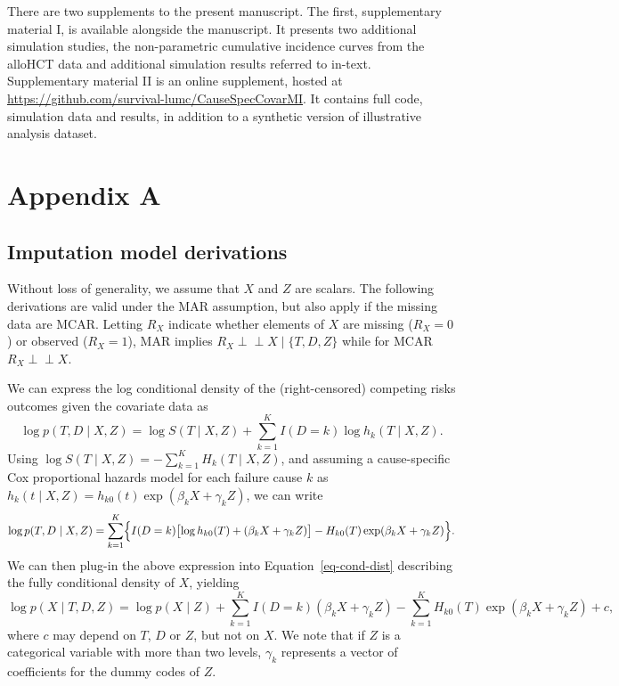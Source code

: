 \documentclass[
  letterpaper,
  DIV=11,
  numbers=noendperiod]{scrreprt}
\newcommand{\indep}{\perp\!\!\!\!\perp}
\begin{document}

There are two supplements to the present manuscript. The first,
supplementary material I, is available alongside the manuscript. It
presents two additional simulation studies, the non-parametric
cumulative incidence curves from the alloHCT data and additional
simulation results referred to in-text. Supplementary material II is an
online supplement, hosted at
\url{https://github.com/survival-lumc/CauseSpecCovarMI}. It contains
full code, simulation data and results, in addition to a synthetic
version of illustrative analysis dataset.

\hypertarget{appendix-a}{%
\section*{Appendix A}\label{appendix-a}}


\hypertarget{imputation-model-derivations}{%
\subsection*{Imputation model
derivations}\label{imputation-model-derivations}}

Without loss of generality, we assume that \(X\) and \(Z\) are scalars.
The following derivations are valid under the MAR assumption, but also
apply if the missing data are MCAR. Letting \(R_X\) indicate whether
elements of \(X\) are missing (\(R_X = 0\)) or observed (\(R_X = 1\)),
MAR implies \(R_X \indep X \mid \{T,D,Z\}\) while for MCAR
\(R_X \indep X\).

We can express the log conditional density of the (right-censored)
competing risks outcomes given the covariate data as \begin{equation*}
    \log p(T, D \mid X, Z) =  \log S(T \mid X, Z) + \sum^K_{k = 1} I(D=k) \log h_k(T \mid X, Z).
\end{equation*} Using
\(\log S(T \mid X, Z) = -\sum^K_{k = 1} H_k(T \mid X,Z)\), and assuming
a cause-specific Cox proportional hazards model for each failure cause
\(k\) as \(h_k(t \mid X, Z) = h_{k0}(t)\exp(\beta_k X + \gamma_k Z)\),
we can write \begin{equation*}
    \log p(T, D \mid X, Z) = \sum^K_{k = 1} \Bigl\{ I(D=k) \bigl[\log h_{k0}(T) + (\beta_k X + \gamma_k Z)\bigr] -  H_{k0}(T)\exp(\beta_k X + \gamma_k Z) \Bigr\}.
\end{equation*} We can then plug-in the above expression into
Equation~\ref{eq-cond-dist} describing the fully conditional density of
\(X\), yielding \begin{equation*}
    \log p(X \mid T,D,Z) = \log p(X \mid Z) + \sum^K_{k = 1} I(D=k) (\beta_k X + \gamma_k Z) - \sum^K_{k = 1} H_{k0}(T)\exp(\beta_k X + \gamma_k Z) + c,
\end{equation*} where \(c\) may depend on \(T\), \(D\) or \(Z\), but not
on \(X\). We note that if \(Z\) is a categorical variable with more than
two levels, \(\gamma_k\) represents a vector of coefficients for the
dummy codes of \(Z\).
\end{document}
